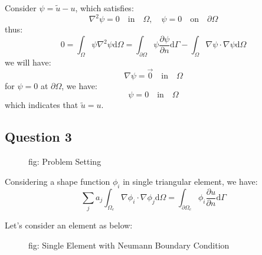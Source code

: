 Consider $\psi=\tilde{u}-u$, which satisfies:
\begin{equation}
    \nabla^2 \psi=0 \quad \text{in} \quad \Omega, \quad\psi=0 \quad \text{on} \quad \partial \Omega
\end{equation}
thus:
\begin{equation}
    0=\int_\Omega \psi\nabla^2 \psi \mathrm{d}\Omega=
    \int_{\partial \Omega} \psi\frac{\partial \psi}{\partial n}\mathrm{d}\Gamma-
    \int_\Omega \nabla \psi\cdot \nabla \psi \mathrm{d}\Omega
\end{equation}
we will have:
\begin{equation}
    \nabla\psi=\vec{0} \quad \text{in} \quad \Omega
\end{equation}
for $\psi=0$ at $\partial \Omega$, we have:
\begin{equation}
    \psi=0 \quad \text{in} \quad \Omega
\end{equation}
which indicates that $\tilde{u}=u$.

\subsection{Question 3}

\begin{figure}[H]
    \centering
    \caption{fig: Problem Setting}
\end{figure}

Considering a shape function $\phi_i$ in single triangular element,
we have:
\begin{equation}
    \sum_j a_j \int_{\Omega_e} \nabla \phi_i \cdot \nabla \phi_j \mathrm{d}\Omega=
    \int_{\partial \Omega_e} \phi_i \frac{\partial u}{\partial n} \mathrm{d}\Gamma
\end{equation}

Let's consider an element as below:
\begin{figure}[H]
    \centering
    \caption{fig: Single Element with Neumann Boundary Condition}
\end{figure}

